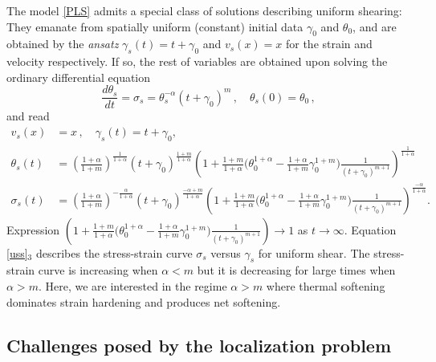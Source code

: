 \documentclass[a4paper,11pt]{article}
\theoremstyle{remark}
\begin{document}
The model \eqref{PLS} admits  a special class of solutions describing uniform shearing: They emanate
from spatially uniform (constant) initial data $\gamma_0$ and $\theta_0$, and are obtained by the {\it ansatz} $\gamma_s (t) = t + \gamma_0 $ and $v_s (x) = x$
for the strain and velocity respectively. If so, the rest of variables are obtained
upon solving the ordinary differential equation
\begin{equation}
\label{uss2}
\frac{d \theta_s }{dt} = \sigma_s = \theta_s^{-\alpha} (t + \gamma_0)^m \, , \quad \theta_s(0) = \theta_0 \, ,
\end{equation}
and read
\begin{equation} \label{uss}
\begin{aligned}
v_s (x)  &=x \, ,   \quad  \gamma_s(t) = t+\gamma_0,  \quad
\\
\theta_s(t) &=  \left( \tfrac{1+\alpha}{1+m }\right )^{\frac{1}{1+\alpha}}  (t+\gamma_0)^{\frac{1 + m}{1+\alpha}}
 \left( 1 +  \tfrac{1+m}{1+\alpha} \big (  \theta_0^{1+\alpha}  - \tfrac{1+\alpha}{1+m} \gamma_0^{1+m} \big ) \tfrac{1}{(t+\gamma_0)^{m+1}}  \right)^{\frac{1}{1+\alpha}}
 \\
  \sigma_s(t)&=
   \left( \tfrac{1+\alpha}{1+m}\right )^{-\frac{\alpha}{1+\alpha}}  (t+\gamma_0)^{\frac{-\alpha + m}{1+\alpha}}
   \left( 1 +  \tfrac{1+m}{1+\alpha} \big (  \theta_0^{1+\alpha}  - \tfrac{1+\alpha}{1+m} \gamma_0^{1+m} \big ) \tfrac{1}{(t+\gamma_0)^{m+1}}  \right)^{\frac{-\alpha}{1+\alpha}} .
\end{aligned}
\end{equation}
Expression $\left( 1 +  \tfrac{1+m}{1+\alpha} \big (  \theta_0^{1+\alpha}  - \tfrac{1+\alpha}{1+m} \gamma_0^{1+m} \big ) \tfrac{1}{(t+\gamma_0)^{m+1}}  \right) \rightarrow 1$ as $t \rightarrow\infty$.
Equation \eqref{uss}$_3$ describes the stress-strain curve $\sigma_s$ versus $\gamma_s$ for uniform shear.
The stress-strain curve is increasing when $\alpha < m$ but it is decreasing for large times when $\alpha > m$.
Here, we are interested in the regime $\alpha > m$ where thermal softening dominates strain hardening and produces net softening.



\subsection{Challenges posed by the localization problem}
\label{sec:challenges}
\end{document}
